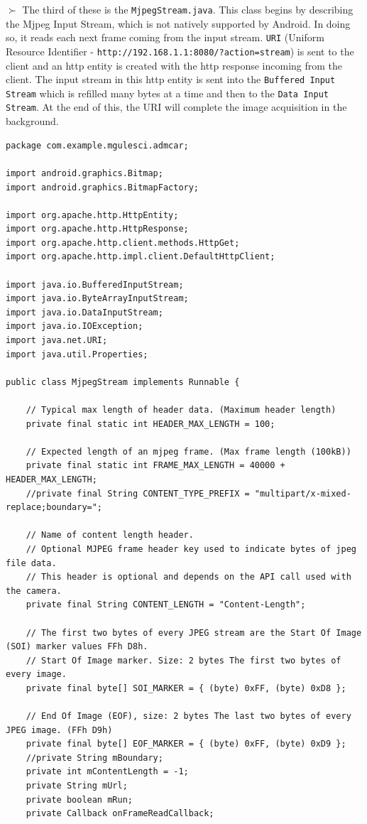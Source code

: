 \documentclass[11pt]{article}
\begin{document}
\begin{flushleft}
$\succ$ The third of these is the \verb|MjpegStream.java|. This class begins by describing the Mjpeg Input Stream, which is not natively supported by Android.  In doing so, it reads each next frame coming from the input stream. \verb|URI| (Uniform Resource Identifier - \verb|http://192.168.1.1:8080/?action=stream|) is sent to the client and an http entity is created with the http response incoming from the client. The input stream in this http entity is sent into the \verb|Buffered Input Stream| which is refilled many bytes at a time and then to the \verb|Data Input Stream|. At the end of this, the URI will complete the image acquisition in the background.
\end{flushleft}
\begin{lstlisting}
package com.example.mgulesci.admcar;

import android.graphics.Bitmap;
import android.graphics.BitmapFactory;

import org.apache.http.HttpEntity;
import org.apache.http.HttpResponse;
import org.apache.http.client.methods.HttpGet;
import org.apache.http.impl.client.DefaultHttpClient;

import java.io.BufferedInputStream;
import java.io.ByteArrayInputStream;
import java.io.DataInputStream;
import java.io.IOException;
import java.net.URI;
import java.util.Properties;

public class MjpegStream implements Runnable {

    // Typical max length of header data. (Maximum header length)
    private final static int HEADER_MAX_LENGTH = 100;

    // Expected length of an mjpeg frame. (Max frame length (100kB))
    private final static int FRAME_MAX_LENGTH = 40000 + HEADER_MAX_LENGTH;
    //private final String CONTENT_TYPE_PREFIX = "multipart/x-mixed-replace;boundary=";

    // Name of content length header.
    // Optional MJPEG frame header key used to indicate bytes of jpeg file data.
    // This header is optional and depends on the API call used with the camera.
    private final String CONTENT_LENGTH = "Content-Length";

    // The first two bytes of every JPEG stream are the Start Of Image (SOI) marker values FFh D8h.
    // Start Of Image marker. Size: 2 bytes The first two bytes of every image.
    private final byte[] SOI_MARKER = { (byte) 0xFF, (byte) 0xD8 };

    // End Of Image (EOF), size: 2 bytes The last two bytes of every JPEG image. (FFh D9h)
    private final byte[] EOF_MARKER = { (byte) 0xFF, (byte) 0xD9 };
    //private String mBoundary;
    private int mContentLength = -1;
    private String mUrl;
    private boolean mRun;
    private Callback onFrameReadCallback;


\end{lstlisting}
\end{document}
